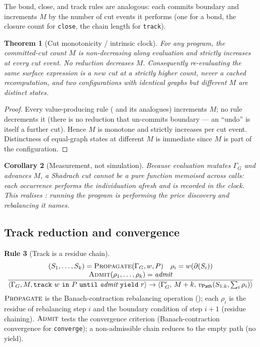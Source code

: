 \documentclass[11pt,a4paper]{article}
\theoremstyle{thmstyle}
\newtheorem{theorem}{Theorem}[section]
\newtheorem{corollary}[theorem]{Corollary}
\theoremstyle{definition}
\newtheorem{rulename}[theorem]{Rule}
\theoremstyle{remark}
\newcommand{\Gph}{\Gamma}
\newcommand{\wt}{w}
\newcommand{\res}{\rho}
\newcommand{\cut}{\partial}
\newcommand{\sh}[1]{\texttt{#1}}
\begin{document}
The bond, close, and track rules are analogous: each commits boundary
and increments $M$ by the number of cut events it performs (one for a
bond, the closure count for \sh{close}, the chain length for \sh{track}).

\begin{theorem}[Cut monotonicity / intrinsic clock]
\label{thm:monotone}
For any program, the committed-cut count $M$ is non-decreasing along
evaluation and strictly increases at every cut event. No reduction
decreases $M$. Consequently re-evaluating the same surface expression is
a new cut at a strictly higher count, never a cached recomputation, and
two configurations with identical graphs but different $M$ are distinct
states.
\end{theorem}

\begin{proof}
Every value-producing rule ( and its analogues)
increments $M$; no rule decrements it (there is no reduction that
un-commits boundary --- an ``undo'' is itself a further cut). Hence $M$
is monotone and strictly increases per cut event. Distinctness of
equal-graph states at different $M$ is immediate since $M$ is part of
the configuration.
\end{proof}

\begin{corollary}[Measurement, not simulation]
\label{cor:measure}
Because evaluation mutates $\Gph_G$ and advances $M$, a Shadrach cut
cannot be a pure function memoised across calls: each occurrence
performs the individuation afresh and is recorded in the clock. This
realises : running the program \emph{is} performing
the price discovery and rebalancing it names.
\end{corollary}

\subsection{Track reduction and convergence}

\begin{rulename}[Track is a residue chain]
\label{rule:track-step}
\[
\frac{\begin{array}{c}
       (S_1,\dots,S_k)=\textsc{Propagate}(\Gph_G,w,P)\quad
       \res_i=\wt(\cut(S_i))\\
       \textsc{Admit}(\res_1,\dots,\res_k)=\textit{admit}
      \end{array}}
     {\langle\Gph_G,M,\sh{track}\ w\ \sh{in}\ P\ \sh{until}\ \textit{admit}\ \sh{yield}\ r\rangle
      \to\langle\Gph_G',\,M+k,\,
      v_{\mathsf{Path}}(S_{1:k},\textstyle\sum_i\res_i)\rangle}
\]
$\textsc{Propagate}$ is the Banach-contraction rebalancing operation
(); each $\res_i$ is the residue of rebalancing
step $i$ and the boundary condition of step $i{+}1$ (residue chaining).
$\textsc{Admit}$ tests the convergence criterion (Banach-contraction
convergence for \sh{converge}); a non-admissible chain reduces to the
empty path (no yield).
\end{rulename}
\end{document}
